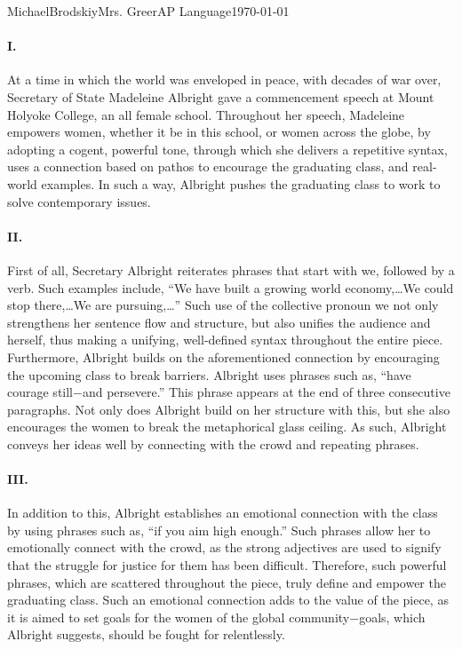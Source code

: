 \documentclass[12pt,letterpaper]{article}
\begin{document}
\begin{mla}{Michael}{Brodskiy}{Mrs. Greer}{AP Language}{\today}{\underline{}} 

  \begin{justifying}

    \paragraph{I.} At a time in which the world was enveloped in peace, with decades of war over, Secretary of State Madeleine Albright gave a commencement speech at Mount Holyoke College, an all female school. Throughout her speech, Madeleine empowers women, whether it be in this school, or women across the globe, by adopting a cogent, powerful tone, through which she delivers a repetitive syntax, uses a connection based on pathos to encourage the graduating class, and real-world examples. In such a way, Albright pushes the graduating class to work to solve contemporary issues.

    \paragraph{II.} First of all, Secretary Albright reiterates phrases that start with we, followed by a verb. Such examples include, ``We have built a growing world economy,\dots We could stop there,\dots We are pursuing,\dots'' Such use of the collective pronoun we not only strengthens her sentence flow and structure, but also unifies the audience and herself, thus making a unifying, well-defined syntax throughout the entire piece. Furthermore, Albright builds on the aforementioned connection by encouraging the upcoming class to break barriers. Albright uses phrases such as, ``have courage still$-$and persevere.'' This phrase appears at the end of three consecutive paragraphs. Not only does Albright build on her structure with this, but she also encourages the women to break the metaphorical glass ceiling. As such, Albright conveys her ideas well by connecting with the crowd and repeating phrases.

    \paragraph{III.} In addition to this, Albright establishes an emotional connection with the class by using phrases such as, ``if you aim high enough.'' Such phrases allow her to emotionally connect with the crowd, as the strong adjectives are used to signify that the struggle for justice for them has been difficult. Therefore, such powerful phrases, which are scattered throughout the piece, truly define and empower the graduating class. Such an emotional connection adds to the value of the piece, as it is aimed to set goals for the women of the global community$-$goals, which Albright suggests, should be fought for relentlessly.


\end{justifying}
\end{mla}
\end{document}
